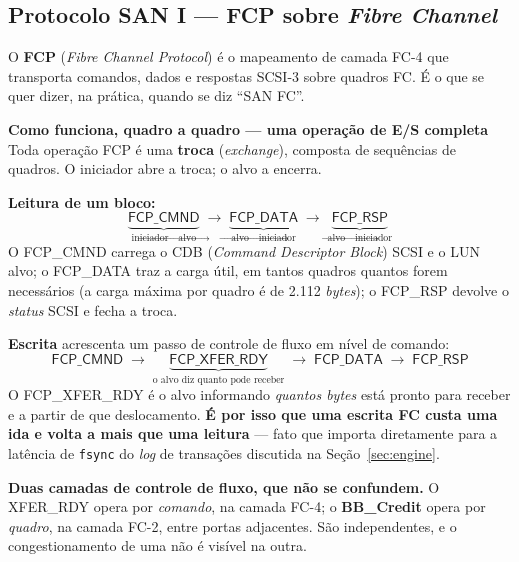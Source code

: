 \documentclass[11pt,a4paper]{article}
\newcommand{\destaque}[2]{%
  \begin{center}\begin{minipage}{0.96\textwidth}
  \colorbox{fundo}{\begin{minipage}{\dimexpr\linewidth-2\fboxsep}
  \vspace{2pt}\textbf{\color{azul}\small #1}\\[1pt]\footnotesize #2\vspace{3pt}
  \end{minipage}}\end{minipage}\end{center}}
\begin{document}
\subsection{Protocolo SAN I --- FCP sobre \textit{Fibre Channel}}
\label{sec:fcp}

O \textbf{FCP} (\textit{Fibre Channel Protocol}) é o mapeamento de camada FC-4 que transporta
comandos, dados e respostas SCSI-3 sobre quadros FC. É o que se quer dizer, na prática, quando se
diz ``SAN FC''.

\destaque{Como funciona, quadro a quadro --- uma operação de E/S completa}{%
Toda operação FCP é uma \textbf{troca} (\textit{exchange}), composta de sequências de quadros. O
iniciador abre a troca; o alvo a encerra.

\smallskip
\textbf{Leitura de um bloco:}
\[
\underbrace{\textsf{FCP\_CMND}}_{\text{iniciador} \rightarrow \text{alvo}} \;\longrightarrow\;
\underbrace{\textsf{FCP\_DATA}}_{\text{alvo} \rightarrow \text{iniciador}} \;\longrightarrow\;
\underbrace{\textsf{FCP\_RSP}}_{\text{alvo} \rightarrow \text{iniciador}}
\]
O \textsf{FCP\_CMND} carrega o CDB (\textit{Command Descriptor Block}) SCSI e o LUN alvo; o
\textsf{FCP\_DATA} traz a carga útil, em tantos quadros quantos forem necessários (a carga máxima
por quadro é de 2.112 \textit{bytes}); o \textsf{FCP\_RSP} devolve o \textit{status} SCSI e fecha a
troca.

\smallskip
\textbf{Escrita} acrescenta um passo de controle de fluxo em nível de comando:
\[
\textsf{FCP\_CMND} \;\longrightarrow\;
\underbrace{\textsf{FCP\_XFER\_RDY}}_{\text{o alvo diz quanto pode receber}} \;\longrightarrow\;
\textsf{FCP\_DATA} \;\longrightarrow\; \textsf{FCP\_RSP}
\]
O \textsf{FCP\_XFER\_RDY} é o alvo informando \emph{quantos bytes} está pronto para receber e a
partir de que deslocamento. \textbf{É por isso que uma escrita FC custa uma ida e volta a mais que
uma leitura} --- fato que importa diretamente para a latência de \texttt{fsync} do \textit{log} de
transações discutida na Seção~\ref{sec:engine}.

\smallskip
\textbf{Duas camadas de controle de fluxo, que não se confundem.} O \textsf{XFER\_RDY} opera por
\emph{comando}, na camada FC-4; o \textbf{BB\_Credit} opera por \emph{quadro}, na camada FC-2, entre
portas adjacentes. São independentes, e o congestionamento de uma não é visível na outra.}
\end{document}
